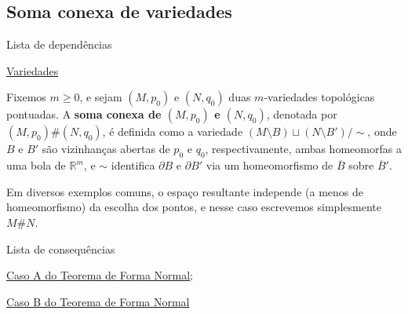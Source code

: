 \subsection{Soma conexa de variedades}
\label{soma-conexa-def}
\begin{titlemize}{Lista de dependências}
	\item \hyperref[variedade-def]{Variedades}
\end{titlemize}
\begin{defi}
	Fixemos $m\geq 0$, e sejam $(M,p_0)$ e $(N,q_0)$ duas $m$-variedades topológicas pontuadas. A \textbf{soma conexa de $(M,p_0)$ e $(N,q_0)$}, denotada por $(M,p_0)\#(N,q_0)$, é definida como a variedade $(M\setminus B) \sqcup (N\setminus B')/\sim$, onde $B$ e $B'$ são vizinhanças abertas de $p_0$ e $q_0$, respectivamente, ambas homeomorfas a uma bola de $\mathbb{R}^m$, e $\sim$ identifica $\partial B$ e $\partial B'$ via um homeomorfismo de $\overline{B}$ sobre $\overline{B}'$.
\end{defi}

Em diversos exemplos comuns, o espaço resultante independe (a menos de homeomorfismo) da escolha dos pontos, e nesse caso escrevemos simplesmente $M\# N$.

\begin{titlemize}{Lista de consequências}
	\item \hyperref[forma-normal-caso-a-thm]{Caso A do Teorema de Forma Normal};\\
    \item \hyperref[forma-normal-caso-b-thm]{Caso B do Teorema de Forma Normal}
\end{titlemize}

